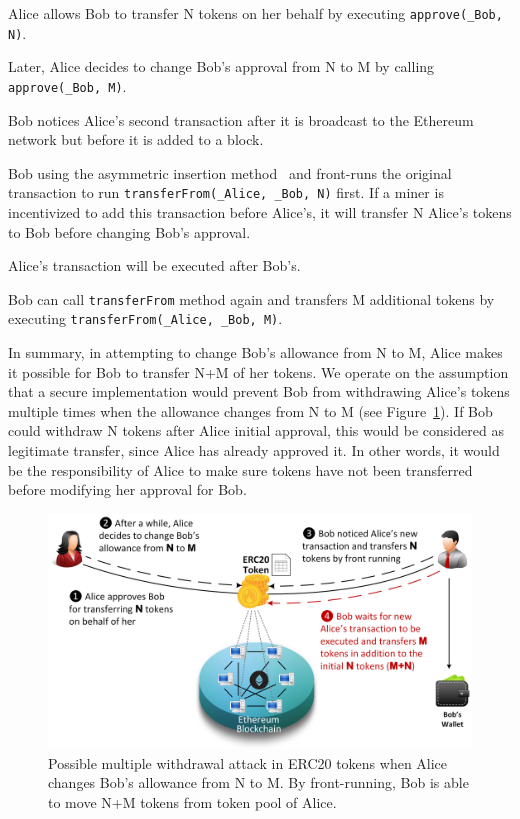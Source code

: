 \begin{compactlistn}
	\item Alice allows Bob to transfer N tokens on her behalf by executing \texttt{approve(\_Bob, N)}.
	\item Later, Alice decides to change Bob's approval from N to M by calling \texttt{approve(\_Bob, M)}.
	\item Bob notices Alice's second transaction after it is broadcast to the Ethereum network but before it is added to a block.
	\item Bob using the asymmetric insertion method~\cite{eskandari2019sok} and front-runs the original transaction to run  \texttt{transferFrom(\_Alice, \_Bob, N)} first. If a miner is incentivized to add this transaction before Alice's, it will transfer N Alice's tokens to Bob before changing Bob's approval.
	\item Alice's transaction will be executed after Bob's.
	\item Bob can call \texttt{transferFrom} method again and transfers M additional tokens by executing \texttt{transferFrom(\_Alice, \_Bob, M)}.
\end{compactlistn}
In summary, in attempting to change Bob's allowance from N to M, Alice makes it possible for Bob to transfer N+M of her tokens. We operate on the assumption that a secure implementation would prevent Bob from withdrawing Alice's tokens multiple times when the allowance changes from N to M (see Figure~\ref{fig:mwa}). If Bob could withdraw N tokens after Alice initial approval, this would be considered as legitimate transfer, since Alice has already approved it. In other words, it would be the responsibility of Alice to make sure tokens have not been transferred before modifying her approval for Bob.
\begin{figure}[ht]
	\centering
	\includegraphics[width=1.0\linewidth]{figures/multiple_withdrawal_02.png}
	\caption{Possible multiple withdrawal attack in ERC20 tokens when Alice changes Bob's allowance from N to M. By front-running, Bob is able to move N+M tokens from token pool of Alice.\label{fig:mwa}}
\end{figure}

